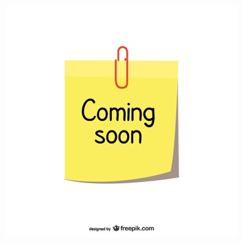 \documentclass{beamer}
\begin{document}
\begin{frame}
\begin{columns}[t]
			\includegraphics[scale= 0.3]{coming-soon}
		\end{columns}
	\end{frame}

		
		
			
			
\end{document}
